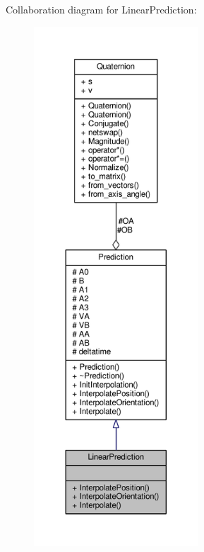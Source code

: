 Collaboration diagram for Linear\+Prediction\+:
\nopagebreak
\begin{figure}[H]
\begin{center}
\leavevmode
\includegraphics[height=550pt]{d8/d3e/classLinearPrediction__coll__graph}
\end{center}
\end{figure}
